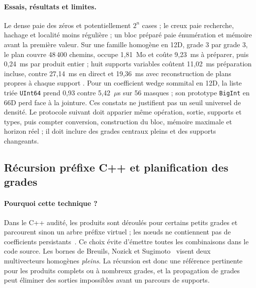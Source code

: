 \documentclass[11pt,a4paper]{article}
\newcommand{\code}[1]{\texttt{#1}}
\begin{document}
\paragraph{Essais, résultats et limites.}
Le dense paie des zéros et potentiellement $2^n$ cases ; le creux paie
recherche, hachage et localité moins régulière ; un bloc préparé paie
énumération et mémoire avant la première valeur. Sur une famille homogène en
12D, grade 3 par grade 3, le plan couvre 48\,400 chemins, occupe 1,81~Mo
et coûte 9,23~ms à préparer, puis 0,24~ms par produit entier ; huit supports
variables coûtent 11,02~ms préparation incluse, contre 27,14~ms en direct
et 19,36~ms avec reconstruction de plans propres à chaque support
. Pour un coefficient wedge sommital en 12D, la liste triée
\code{UInt64} prend 0,93 contre 5,42~\(\mu\)s sur 56 masques ; son prototype
\code{BigInt} en 66D perd face à la jointure. Ces constats
ne justifient pas un seuil universel de densité. Le protocole suivant doit
apparier même opération, sortie, supports et types, puis compter conversion,
construction du bloc, mémoire maximale et horizon réel ; il doit inclure des
grades centraux pleins et des supports changeants.

\subsection{Récursion préfixe C++ et planification des grades}
\paragraph{Pourquoi cette technique ?}
Dans le C++ audité, les produits sont déroulés pour certains petits grades
et parcourent sinon un arbre préfixe virtuel ; les nœuds ne contiennent pas
de coefficients persistants~\cite{cppgeometric,cppdispatch}. Ce choix évite
d'émettre toutes les combinaisons dans le code source. Les bornes de
Breuils, Nozick et Sugimoto~\cite{breuils2020} visent deux multivecteurs
homogènes \emph{pleins}. La récursion est donc une référence pertinente
pour les produits complets ou à nombreux grades, et la propagation de grades
peut éliminer des sorties impossibles avant un parcours de supports.
\end{document}
